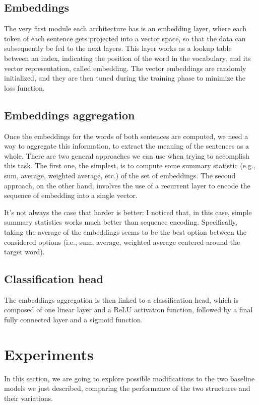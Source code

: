 \documentclass[11pt,a4paper]{article}
\begin{document}
	
	\subsection{Embeddings}
	The very first module each architecture has is an embedding layer, where each token of each sentence gets projected into a vector space, so that the data can subsequently be fed to the next layers. This layer works as a lookup table between an index, indicating the position of the word in the vocabulary, and its vector representation, called embedding. The vector embeddings are randomly initialized, and they are then tuned during the training phase to minimize the loss function.
	
	\subsection{Embeddings aggregation}
	Once the embeddings for the words of both sentences are computed, we need a way to aggregate this information, to extract the meaning of the sentences as a whole. There are two general approaches we can use when trying to accomplish this task. The first one, the simplest, is to compute some summary statistic (e.g., sum, average, weighted average, etc.) of the set of embeddings. The second approach, on the other hand, involves the use of a recurrent layer to encode the sequence of embedding into a single vector.
	
	It's not always the case that harder is better: I noticed that, in this case, simple summary statistics works much better than sequence encoding. Specifically, taking the average of the embeddings seems to be the best option between the considered options (i.e., sum, average, weighted average centered around the target word).
	
	\subsection{Classification head}
	The embeddings aggregation is then linked to a classification head, which is composed of one linear layer and a ReLU activation function, followed by a final fully connected layer and a sigmoid function.

	\section{Experiments}
	In this section, we are going to explore possible modifications to the two baseline models we just described, comparing the performance of the two structures and their variations.
	
\end{document}
